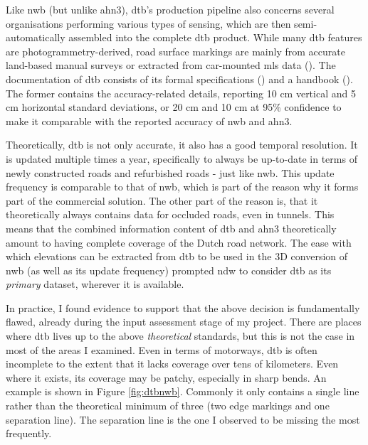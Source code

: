 Like \ac{nwb} (but unlike \ac{ahn3}), \ac{dtb}’s production pipeline also concerns several organisations performing various types of sensing, which are then semi-automatically assembled into the complete \ac{dtb} product. While many \ac{dtb} features are photogrammetry-derived, road surface markings are mainly from accurate land-based manual surveys or extracted from car-mounted \ac{mls} data (\cite{oudeElberink_vosselman_2012}). The documentation of \ac{dtb} consists of its formal specifications (\cite{dtb_docs}) and a handbook (\cite{dtb_handbook}). The former contains the accuracy-related details, reporting 10 cm vertical and 5 cm horizontal standard deviations, or 20 cm and 10 cm at 95\% confidence to make it comparable with the reported accuracy of \ac{nwb} and \ac{ahn3}.

Theoretically, \ac{dtb} is not only accurate, it also has a good temporal resolution. It is updated multiple times a year, specifically to always be up-to-date in terms of newly constructed roads and refurbished roads - just like \ac{nwb}. This update frequency is comparable to that of \ac{nwb}, which is part of the reason why it forms part of the commercial solution. The other part of the reason is, that it theoretically always contains data for occluded roads, even in tunnels. This means that the combined information content of \ac{dtb} and \ac{ahn3} theoretically amount to having complete coverage of the Dutch road network. The ease with which elevations can be extracted from \ac{dtb} to be used in the 3D conversion of \ac{nwb} (as well as its update frequency) prompted \ac{ndw} to consider \ac{dtb} as its \textit{primary} dataset, wherever it is available.

In practice, I found evidence to support that the above decision is fundamentally flawed, already during the input assessment stage of my project. There are places where \ac{dtb} lives up to the above \textit{theoretical} standards, but this is not the case in most of the areas I examined. Even in terms of motorways, \ac{dtb} is often incomplete to the extent that it lacks coverage over tens of kilometers. Even where it exists, its coverage may be patchy, especially in sharp bends. An example is shown in Figure \ref{fig:dtbnwb}. Commonly it only contains a single line rather than the theoretical minimum of three (two edge markings and one separation line). The separation line is the one I observed to be missing the most frequently.

